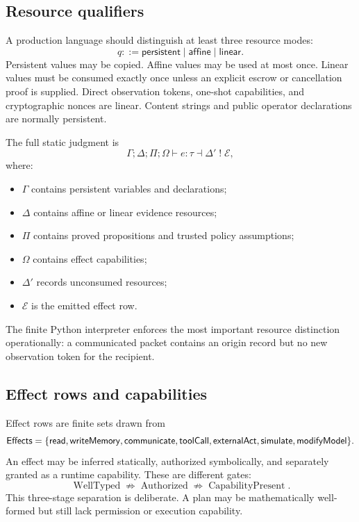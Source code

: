 \subsection{Resource qualifiers}

A production language should distinguish at least three resource modes:
\[
q::=\mathsf{persistent}\mid\mathsf{affine}\mid\mathsf{linear}.
\]
Persistent values may be copied.  Affine values may be used at most once.
Linear values must be consumed exactly once unless an explicit escrow or
cancellation proof is supplied.  Direct observation tokens, one-shot
capabilities, and cryptographic nonces are linear.  Content strings and public
operator declarations are normally persistent.

The full static judgment is
\[
\Gamma;\Delta;\Pi;\Omega
\vdash e:\tau
\dashv\Delta'
\;!\;\mathcal E,
\]
where:
\begin{itemize}[leftmargin=1.6em]
  \item \(\Gamma\) contains persistent variables and declarations;
  \item \(\Delta\) contains affine or linear evidence resources;
  \item \(\Pi\) contains proved propositions and trusted policy assumptions;
  \item \(\Omega\) contains effect capabilities;
  \item \(\Delta'\) records unconsumed resources;
  \item \(\mathcal E\) is the emitted effect row.
\end{itemize}
The finite Python interpreter enforces the most important resource distinction
operationally: a communicated packet contains an origin record but no new
observation token for the recipient.

\subsection{Effect rows and capabilities}

Effect rows are finite sets drawn from
\[
\mathsf{Effects}=
\{
\mathsf{read},
\mathsf{writeMemory},
\mathsf{communicate},
\mathsf{toolCall},
\mathsf{externalAct},
\mathsf{simulate},
\mathsf{modifyModel}
\}.
\]
An effect may be inferred statically, authorized symbolically, and separately
granted as a runtime capability.  These are different gates:
\[
\operatorname{WellTyped}
\not\Rightarrow
\operatorname{Authorized}
\not\Rightarrow
\operatorname{CapabilityPresent}.
\]
This three-stage separation is deliberate.  A plan may be mathematically
well-formed but still lack permission or execution capability.

